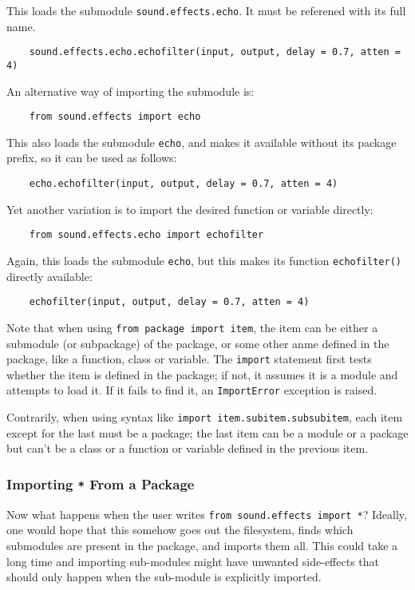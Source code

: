 \documentclass[UTF8]{article}
\begin{document}
This loads the submodule \texttt{sound.effects.echo}. It must be referened with its full name.
\begin{verbatim}
    sound.effects.echo.echofilter(input, output, delay = 0.7, atten = 4)
\end{verbatim}

An alternative way of importing the submodule is:
\begin{verbatim}
    from sound.effects import echo
\end{verbatim}

This also loads the submodule \texttt{echo}, and makes it available without its package prefix, so
it can be used as follows:
\begin{verbatim}
    echo.echofilter(input, output, delay = 0.7, atten = 4)
\end{verbatim}

Yet another variation is to import the desired function or variable directly:
\begin{verbatim}
    from sound.effects.echo import echofilter
\end{verbatim}

Again, this loads the submodule \texttt{echo}, but this makes its function \texttt{echofilter()}
directly available:
\begin{verbatim}
    echofilter(input, output, delay = 0.7, atten = 4)
\end{verbatim}

Note that when using \texttt{from package import item}, the item can be either a
submodule (or subpackage) of the package, or some other anme defined in the package, like a
function, class or variable. The \texttt{import} statement first tests whether the item is defined
in the package; if not, it assumes it is a module and attempts to load it. If it fails to find it,
an \texttt{ImportError} exception is raised.

Contrarily, when using syntax like \texttt{import item.subitem.subsubitem}, each item
except for the last must be a package; the last item can be a module or a package but can't be a
class or a function or variable defined in the previous item.

\subsubsection{Importing \texttt{*} From a Package}
Now what happens when the user writes \texttt{from sound.effects import *}? Ideally,
one would hope that this somehow goes out the filesystem, finds which submodules are present in the
package, and imports them all. This could take a long time and importing sub-modules might have
unwanted side-effects that should only happen when the sub-module is explicitly imported.
\end{document}
